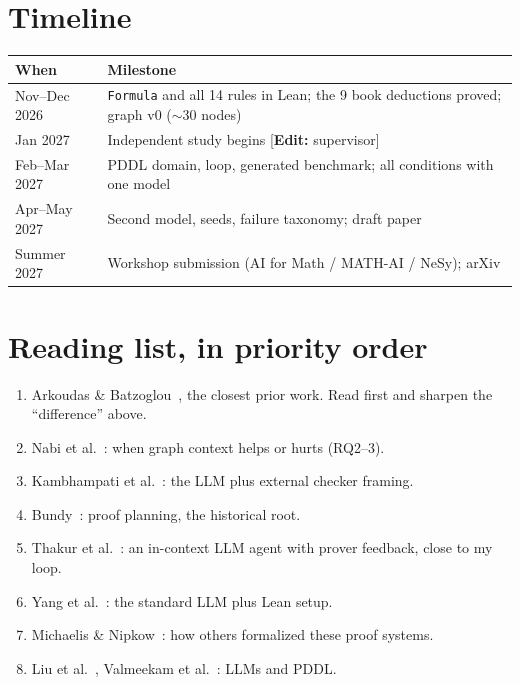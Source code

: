 \documentclass[11pt]{article}
\newcommand{\note}[1]{\textcolor{orange!80!black}{\small[\textbf{Edit:} #1]}}
\begin{document}
\section{Timeline}
\begin{center}
\small
\begin{tabularx}{\linewidth}{@{}lX@{}}
\toprule
When & Milestone \\
\midrule
Nov--Dec 2026 & \texttt{Formula} and all 14 rules in Lean; the 9 book deductions proved; graph v0 ($\sim$30 nodes) \\
Jan 2027 & Independent study begins \note{supervisor} \\
Feb--Mar 2027 & PDDL domain, loop, generated benchmark; all conditions with one model \\
Apr--May 2027 & Second model, seeds, failure taxonomy; draft paper \\
Summer 2027 & Workshop submission (AI for Math / MATH-AI / NeSy); arXiv \\
\bottomrule
\end{tabularx}
\end{center}

\section{Reading list, in priority order}
\begin{enumerate}[leftmargin=*]
  \item Arkoudas \& Batzoglou~\cite{arkoudas2025stress}, the closest prior work. Read first and sharpen the ``difference'' above.
  \item Nabi et al.~\cite{nabi2026structured}: when graph context helps or hurts (RQ2--3).
  \item Kambhampati et al.~\cite{kambhampati2024llmmodulo}: the LLM plus external checker framing.
  \item Bundy~\cite{bundy1996proofplanning}: proof planning, the historical root.
  \item Thakur et al.~\cite{thakur2024copra}: an in-context LLM agent with prover feedback, close to my loop.
  \item Yang et al.~\cite{yang2023leandojo}: the standard LLM plus Lean setup.
  \item Michaelis \& Nipkow~\cite{michaelis2018formalized}: how others formalized these proof systems.
  \item Liu et al.~\cite{liu2023llmp}, Valmeekam et al.~\cite{valmeekam2023planbench}: LLMs and PDDL.
\end{enumerate}
\end{document}

